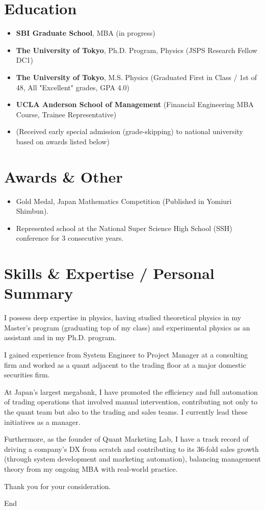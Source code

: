 \documentclass[uplatex,a4j,10.5pt,dvipdfmx]{jsarticle}
\begin{document}
\section*{Education}
\begin{itemize}[leftmargin=*]
	\item \textbf{SBI Graduate School}, MBA (in progress)
	\item \textbf{The University of Tokyo}, Ph.D. Program, Physics (JSPS Research Fellow DC1)
	\item \textbf{The University of Tokyo}, M.S. Physics (Graduated First in Class / 1st of 48, All "Excellent" grades, GPA 4.0)
	\item \textbf{UCLA Anderson School of Management} (Financial Engineering MBA Course, Trainee Representative)
	\item (Received early special admission (grade-skipping) to national university based on awards listed below)
\end{itemize}

\section*{Awards \& Other}
\begin{itemize}[leftmargin=*]
	\item Gold Medal, Japan Mathematics Competition (Published in Yomiuri Shimbun).
	\item Represented school at the National Super Science High School (SSH) conference for 3 consecutive years.
\end{itemize}

\section*{Skills \& Expertise / Personal Summary}

I possess deep expertise in physics, having studied theoretical physics in my Master's program (graduating top of my class) and experimental physics as an assistant and in my Ph.D. program.

I gained experience from System Engineer to Project Manager at a consulting firm and worked as a quant adjacent to the trading floor at a major domestic securities firm.

At Japan's largest megabank, I have promoted the efficiency and full automation of trading operations that involved manual intervention, contributing not only to the quant team but also to the trading and sales teams. I currently lead these initiatives as a manager.

Furthermore, as the founder of Quant Marketing Lab, I have a track record of driving a company's DX from scratch and contributing to its 36-fold sales growth (through system development and marketing automation), balancing management theory from my ongoing MBA with real-world practice.

\vspace{1\baselineskip}
Thank you for your consideration.

\vspace{1\baselineskip}
\hfill End
\end{document}
